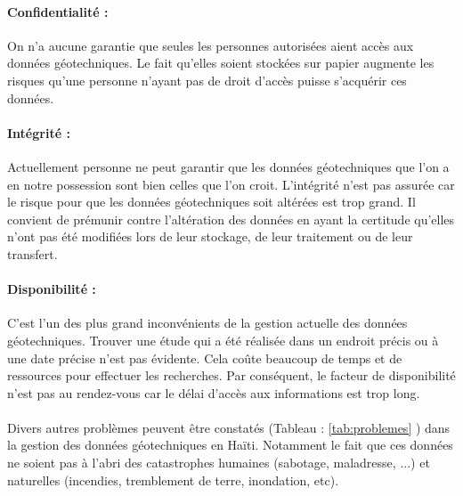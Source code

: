 \paragraph{Confidentialité : }
On n'a aucune garantie que seules les personnes autorisées 
aient accès aux données géotechniques. Le fait qu'elles soient
stockées sur papier augmente les risques qu'une personne
n'ayant pas de droit d'accès puisse s'acquérir ces données.
\paragraph{Intégrité : }
Actuellement personne ne peut
garantir que les données géotechniques que l'on a en notre possession 
sont bien celles que l’on croit. L'intégrité n'est pas assurée car le risque
pour que les données géotechniques soit altérées est trop grand.
Il convient de prémunir contre l'altération des données en ayant la certitude 
qu'elles n'ont pas été modifiées lors de leur stockage, de leur traitement ou 
de leur transfert.
\paragraph{Disponibilité :}
C'est l'un des plus grand inconvénients de la gestion actuelle des 
données géotechniques. Trouver une étude qui a été réalisée dans un endroit précis
ou à une date précise n'est pas évidente. Cela coûte beaucoup de temps et de ressources 
pour effectuer
les recherches. Par conséquent, le facteur de disponibilité n'est pas 
au rendez-vous car le délai d'accès aux informations est trop long.

\paragraph{}
Divers autres problèmes peuvent être constatés (Tableau : \ref{tab:problemes} )  dans la gestion
des données géotechniques en Haïti. Notamment le fait que ces données
ne soient pas à l'abri des catastrophes humaines (sabotage, maladresse, ...) et naturelles
(incendies, tremblement de terre, inondation, etc).


